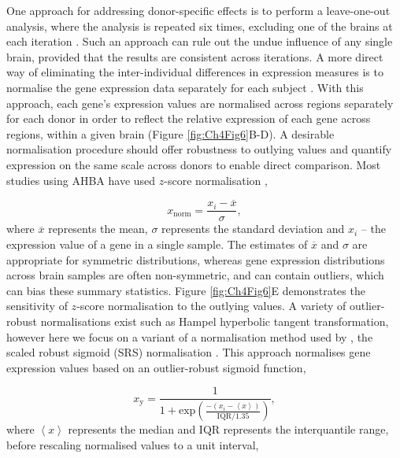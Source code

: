 One approach for addressing donor-specific effects is to perform a leave-one-out analysis, where the analysis is repeated six times, excluding one of the brains at each iteration \citep{Parkes2017,McColgan2018}. Such an approach can rule out the undue influence of any single brain, provided that the results are consistent across iterations. A more direct way of eliminating the inter-individual differences in expression measures is to normalise the gene expression data separately for each subject \citep{Richiardi2015,Whitaker2016a,Vertes2016b,Rizzo2016,Liu2017,Negi2017,Burt2018,McColgan2018,Romero-Garcia2018a}. With this approach, each gene’s expression values are normalised across regions separately for each donor in order to reflect the relative expression of each gene across regions, within a given brain (Figure \ref{fig:Ch4Fig6}B-D). A desirable normalisation procedure should offer robustness to outlying values and quantify expression on the same scale across donors to enable direct comparison. Most studies using AHBA have used $z$-score normalisation \citep{Rizzo2016,Whitaker2016a,Vertes2016b,Negi2017,Romero-Garcia2018a},

\begin{equation}
    \label{eqn:eq1}
    x_\mathrm{norm} = \frac{x_\mathrm{\textit{i}}-\overline{x}}{\sigma},
\end{equation}
where $\overline{x}$ represents the mean, $\sigma$ represents the standard deviation and $x_\mathrm{\textit{i}}$ -- the expression value of a gene in a single sample. The estimates of $\overline{x}$ and $\sigma$ are appropriate for symmetric distributions, whereas gene expression distributions across brain samples are often non-symmetric, and can contain outliers, which can bias these summary statistics. Figure \ref{fig:Ch4Fig6}E demonstrates the sensitivity of $z$-score normalisation to the outlying values.
A variety of outlier-robust normalisations exist such as Hampel hyperbolic tangent transformation, however here we focus on a variant of a normalisation method used by \citet{Fulcher2016}, the scaled robust sigmoid (SRS) normalisation \mbox{\citep{Fulcher2013}}. This approach normalises gene expression values based on an outlier-robust sigmoid function,

\begin{equation}
    \label{eqn:eq2}
    x_\mathrm{y} = \frac{1}{1+\mathrm{exp}({\frac{-(x_\mathrm{\textit{i}}-\left\langle x \right\rangle)}{\mathrm{IQR}/1.35}})},
\end{equation}
where $\left\langle x \right\rangle$ represents the median and $\mathrm{IQR}$ represents the interquantile range, before rescaling normalised values to a unit interval,

